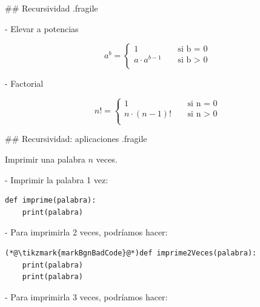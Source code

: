 ## Recursividad {.fragile}


- Elevar a potencias

$$ a^b = \begin{cases}
        1               & \;\;\;\;\text{si b = 0} \\
        a \cdot a^{b-1} & \;\;\;\;\text{si b > 0} \\
    \end{cases}
$$

- Factorial

$$ n! = \begin{cases}
        1               & \;\;\;\;\text{si n = 0} \\
        n \cdot (n-1)!  & \;\;\;\;\text{si n > 0} \\
    \end{cases}
$$

## Recursividad: aplicaciones {.fragile}

\bgnblockgood
{} Imprimir una palabra $n$ veces.
\trmblockgood

\pause
\vspace{1ex}


\bgncolumns[-4ex]

- Imprimir la palabra 1 vez:


\begin{lstlisting}
def imprime(palabra):
    print(palabra)
\end{lstlisting}

\trmcolumns

\pause

\bgncolumns[-2ex]

- Para imprimirla 2 veces, podríamos hacer:


\begin{lstlisting}
(*@\tikzmark{markBgnBadCode}@*)def imprime2Veces(palabra):
    print(palabra)
    print(palabra)
\end{lstlisting}

\trmcolumns

\bgncolumns[-2ex]

- Para imprimirla 3 veces, podríamos hacer:


